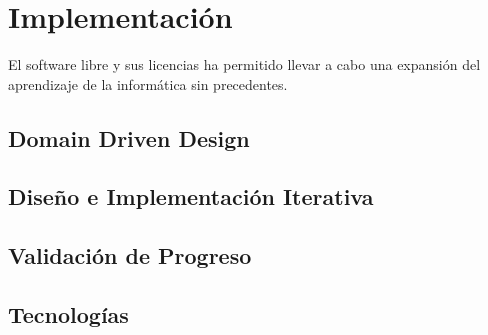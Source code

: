 \chapter{Implementación}

El software libre y sus licencias \cite{gplv3} ha permitido llevar a cabo una expansión del
aprendizaje de la informática sin precedentes.
 
\section{Domain Driven Design}

\section{Diseño e Implementación Iterativa}

\section{Validación de Progreso}

\section{Tecnologías}